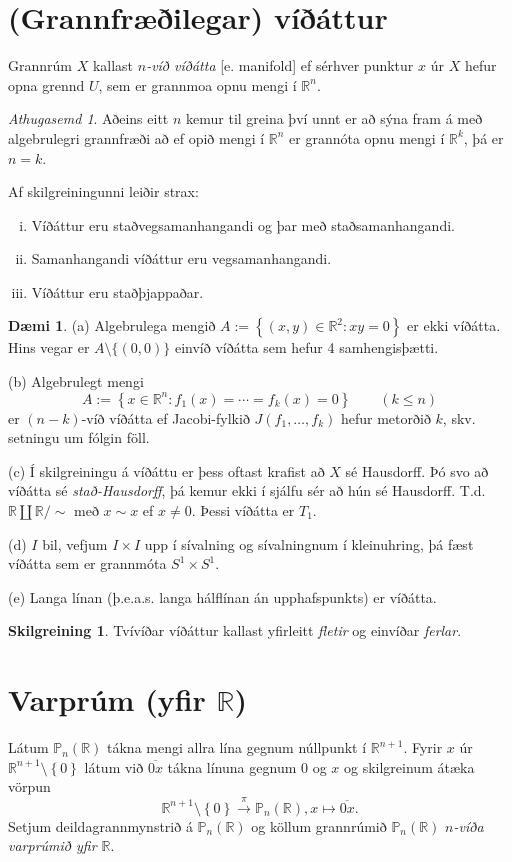 \documentclass[a4paper,icelandic]{book}
\theoremstyle{definition}
\newtheorem{skilgr}{Skilgreining}[section]
\newtheorem{daemi}{Dæmi}[section]
\theoremstyle{plain}
\theoremstyle{remark}
\newtheorem*{ath}{Athugasemd}
\newcommand{\R}{\mathbb{R}} %
\begin{document}
\section{(Grannfræðilegar) víðáttur}
Grannrúm $X$ kallast \emph{$n$-víð víðátta} [e. manifold]
ef sérhver punktur $x$ úr $X$ hefur opna grennd $U$, sem er grannmoa
opnu mengi í $\R^n$. 
\begin{ath}
  Aðeins eitt $n$ kemur til greina því unnt er að sýna fram á með
  algebrulegri grannfræði að ef opið mengi í $\R^n$ er grannóta opnu
  mengi í $\R^k$, þá er $n=k$.
\end{ath}
Af skilgreiningunni leiðir strax:
\begin{enumerate}[(i)]
  \item Víðáttur eru staðvegsamanhangandi og þar með staðsamanhangandi.
  \item Samanhangandi víðáttur eru vegsamanhangandi. 
  \item Víðáttur eru staðþjappaðar. 
\end{enumerate}
\begin{daemi}
  (a) Algebrulega mengið $A := \left\{ (x,y) \in\R^2 : xy = 0 \right\}$
  er ekki víðátta. Hins vegar er $A\setminus\{(0,0)\}$ einvíð víðátta
  sem hefur 4 samhengisþætti.

  (b) Algebrulegt mengi\[
  A := \left\{ x\in\R^n : f_1(x)=\cdots = f_k(x)=0 \right\}
  \qquad(k\leq n)
  \]
  er $(n-k)$-víð víðátta ef Jacobi-fylkið $J(f_1,\dots,f_k)$ hefur
  metorðið $k$, skv. setningu um fólgin föll.

  (c) Í skilgreiningu á víðáttu er þess oftast krafist að $X$ sé
  Hausdorff. Þó svo að víðátta sé \emph{stað-Hausdorff}, þá kemur ekki í
  sjálfu sér að hún sé Hausdorff. T.d. $\R\coprod\R / \sim$ með $x\sim
  x$ ef $x\neq 0$. Þessi víðátta er $T_1$.

  (d) $I$ bil, vefjum $I\times I$ upp í sívalning og sívalningnum í
  kleinuhring, þá fæst víðátta sem er grannmóta $S^1\times S^1$.

  (e) Langa línan (þ.e.a.s. langa hálflínan án upphafspunkts) er
  víðátta.
\end{daemi}

\begin{skilgr}
  Tvívíðar víðáttur kallast yfirleitt \emph{fletir} og
  einvíðar \emph{ferlar}.
\end{skilgr}

\section{Varprúm (yfir $\R$)}
Látum $\mathbb P_n(\R)$ tákna mengi allra lína gegnum núllpunkt í
$\R^{n+1}$. Fyrir $x$ úr $\R^{n+1}\setminus\left\{ 0 \right\}$ látum við
$\overline{0x}$ tákna línuna gegnum $0$ og $x$ og skilgreinum átæka
vörpun\[
\R^{n+1}\setminus \left\{ 0 \right\}\xrightarrow{\pi} \mathbb P_n(\R),
x\mapsto \overline{0x}.
\]
Setjum deildagrannmynstrið á $\mathbb P_n(\R)$ og köllum grannrúmið
$\mathbb P_n(\R)$ \emph{$n$-víða varprúmið yfir $\R$}.
\end{document}
